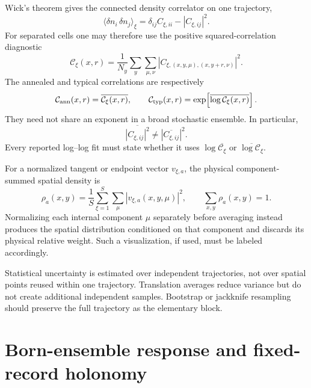 Wick's theorem gives the connected density correlator on one trajectory,
\begin{equation}
    \langle\delta n_i\,\delta n_j\rangle_\xi
    =\delta_{ij}C_{\xi,ii}-|C_{\xi,ij}|^2.
    \label{eq:app-density-correlation}
\end{equation}
For separated cells one may therefore use the positive squared-correlation
diagnostic
\begin{equation}
    \mathcal C_\xi(x,r)
    =\frac{1}{N_y}\sum_y\sum_{\mu,\nu}
      \left|C_{\xi,(x,y,\mu),(x,y+r,\nu)}\right|^2.
    \label{eq:app-squared-correlation}
\end{equation}
The annealed and typical correlations are respectively
\begin{equation}
    \mathcal C_{\rm ann}(x,r)=\overline{\mathcal C_\xi(x,r)},
    \qquad
    \mathcal C_{\rm typ}(x,r)
    =\exp\!\left[\overline{\log\mathcal C_\xi(x,r)}\right].
    \label{eq:app-annealed-typical-correlation}
\end{equation}
They need not share an exponent in a broad stochastic ensemble.  In
particular,
\begin{equation}
    \overline{|C_{\xi,ij}|^2}
    \ne |\overline{C_{\xi,ij}}|^2.
    \label{eq:app-correlation-average-order}
\end{equation}
Every reported log--log fit must state whether it uses
\(\log\overline{\mathcal C_\xi}\) or
\(\overline{\log\mathcal C_\xi}\).

For a normalized tangent or endpoint vector \(v_{\xi,a}\), the physical
component-summed spatial density is
\begin{equation}
    \rho_a(x,y)
    =\frac1S\sum_{\xi=1}^{S}\sum_\mu
      |v_{\xi,a}(x,y,\mu)|^2,
    \qquad
    \sum_{x,y}\rho_a(x,y)=1.
    \label{eq:app-tangent-mode-density}
\end{equation}
Normalizing each internal component \(\mu\) separately before averaging
instead produces the spatial distribution conditioned on that component and
discards its physical relative weight.  Such a visualization, if used, must
be labeled accordingly.

Statistical uncertainty is estimated over independent trajectories, not over
spatial points reused within one trajectory.  Translation averages reduce
variance but do not create additional independent samples.  Bootstrap or
jackknife resampling should preserve the full trajectory as the elementary
block.


\section{Born-ensemble response and fixed-record holonomy}
\label{app:response-holonomy}

